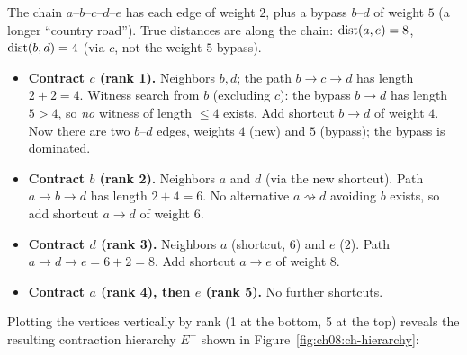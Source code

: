 The chain $a$--$b$--$c$--$d$--$e$ has each edge of weight $2$, plus a
bypass $b$--$d$ of weight $5$ (a longer ``country road''). True distances are
along the chain: $\operatorname{dist}(a,e)=8$, $\operatorname{dist}(b,d)=4$ (via $c$, not the weight-$5$
bypass).

\begin{itemize}
  \item \textbf{Contract $c$ (rank 1).} Neighbors $b,d$; the path $b\to c\to d$
        has length $2+2=4$. Witness search from $b$ (excluding $c$): the bypass
        $b\to d$ has length $5>4$, so \emph{no} witness of length $\le 4$ exists.
        Add shortcut $b\to d$ of weight $4$. Now there are two $b$--$d$ edges,
        weights $4$ (new) and $5$ (bypass); the bypass is dominated.
  \item \textbf{Contract $b$ (rank 2).} Neighbors $a$ and $d$ (via the new
        shortcut). Path $a\to b\to d$ has length $2+4=6$. No alternative
        $a\rightsquigarrow d$ avoiding $b$ exists, so add shortcut $a\to d$ of
        weight $6$.
  \item \textbf{Contract $d$ (rank 3).} Neighbors $a$ (shortcut, $6$) and $e$
        ($2$). Path $a\to d\to e=6+2=8$. Add shortcut $a\to e$ of weight $8$.
  \item \textbf{Contract $a$ (rank 4), then $e$ (rank 5).} No further shortcuts.
\end{itemize}

Plotting the vertices vertically by rank (1 at the bottom, 5 at the top) reveals
the resulting contraction hierarchy $E^{+}$ shown in Figure~\ref{fig:ch08:ch-hierarchy}:

